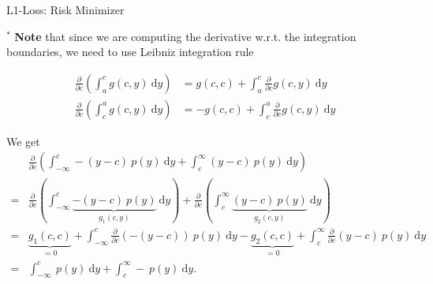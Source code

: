 \documentclass[11pt,compress,t,notes=noshow, xcolor=table]{beamer}
\begin{document}
\begin{frame2}[footnotesize]{L1-Loss: Risk Minimizer}

$^\ast$ \textbf{Note} that since we are computing the derivative w.r.t. the integration boundaries, we need to use Leibniz integration rule 

\begin{align*}
  \frac{\partial}{\partial c} (\int_a^c g(c, y) ~\text{d}y) &= g(c, c) + \int_a^c \frac{\partial}{\partial c} g(c, y) ~\text{d}y \\
  \frac{\partial}{\partial c} (\int_c^a g(c, y) ~\text{d}y) &= - g(c, c) + \int_c^a \frac{\partial}{\partial c} g(c, y) ~\text{d}y    
\end{align*}

We get 
\begin{align*}
&\frac{\partial}{\partial c} (\int_{-\infty}^c -(y - c)~p(y)~\text{d}y + \int_c^\infty (y - c)~p(y)~\text{d}y ) \\
=& \frac{\partial}{\partial c} (\int_{-\infty}^c \underbrace{-(y - c)~p(y)}_{g_1(c, y)}~\text{d}y) + \frac{\partial}{\partial c} (\int_c^\infty \underbrace{(y - c)~p(y)}_{g_2(c, y)}~\text{d}y ) \\
=& \underbrace{g_1(c, c)}_{=0} + \int_{-\infty}^c \frac{\partial}{\partial c}  (-(y - c))~p(y)~\text{d}y - \underbrace{g_2(c, c)}_{= 0} + \int_c^\infty \frac{\partial}{\partial c}  (y - c)~p(y)~\text{d}y \\
=& \int_{-\infty}^c  ~p(y)~\text{d}y + \int_c^\infty -~p(y)~\text{d}y. 
\end{align*}

\end{frame2}
\end{document}
